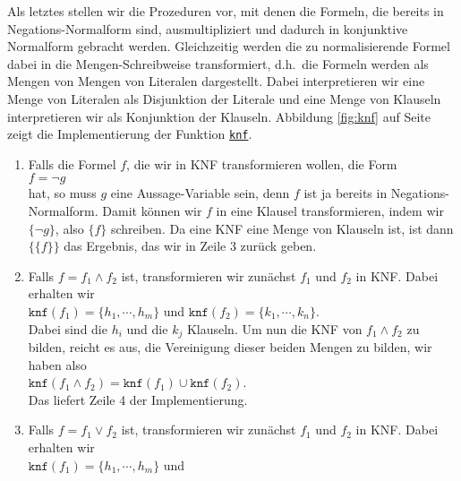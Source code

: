 Als letztes stellen wir die Prozeduren vor, mit denen die Formeln, die bereits in
Negations-Normalform sind, ausmultipliziert und dadurch in konjunktive
Normalform gebracht werden.  Gleichzeitig werden  die zu normalisierende Formel dabei
in die Mengen-Schreibweise transformiert, d.h.~die Formeln werden als Mengen von Mengen 
von Literalen dargestellt.  Dabei interpretieren wir eine Menge von Literalen als
Disjunktion der Literale und eine Menge von Klauseln interpretieren wir als Konjunktion
der Klauseln.
Abbildung \ref{fig:knf} auf Seite \pageref{fig:knf} zeigt die Implementierung der Funktion
\href{https://github.com/karlstroetmann/Logik/blob/master/SetlX/knf.stlx}{\texttt{knf}}.
\begin{enumerate}
\item Falls die Formel $f$, die wir in KNF transformieren wollen, die Form \\[0.2cm]
      \hspace*{1.3cm} $f = \neg g$ \\[0.2cm]
      hat, so muss $g$ eine Aussage-Variable sein, denn $f$ ist ja bereits in
      Negations-Normalform.  Damit k\"{o}nnen wir $f$ in eine Klausel transformieren, 
      indem wir $\{\neg g\}$, also $\{f\}$ schreiben.  
      Da eine KNF eine Menge von Klauseln ist, ist dann 
      $\bigl\{\{f\}\bigr\}$ das Ergebnis, das wir in Zeile 3 zur\"{u}ck geben.
\item Falls $f= f_1 \wedge f_2$ ist, transformieren wir zun\"{a}chst $f_1$ und $f_2$ in KNF.
      Dabei erhalten wir \\[0.2cm]
      \hspace*{1.3cm} 
      $\mathtt{knf}(f_1) = \{ h_1, \cdots, h_m \}$ \quad und \quad
      $\mathtt{knf}(f_2) = \{ k_1, \cdots, k_n \}$. \\[0.2cm]
      Dabei sind die $h_i$ und die $k_j$ Klauseln.  Um nun die KNF von $f_1 \wedge f_2$ 
      zu bilden, reicht es aus, die Vereinigung dieser beiden Mengen zu bilden,
      wir haben also \\[0.2cm]
      \hspace*{1.3cm} $\mathtt{knf}(f_1 \wedge f_2) = \mathtt{knf}(f_1) \cup  \mathtt{knf}(f_2)$.
      \\[0.2cm]
      Das liefert Zeile 4 der Implementierung.
\item Falls $f= f_1 \vee f_2$ ist, transformieren wir zun\"{a}chst $f_1$ und $f_2$ in KNF.
      Dabei erhalten wir \\[0.2cm]
      \hspace*{1.3cm} 
      $\mathtt{knf}(f_1) = \{ h_1, \cdots, h_m \}$ \quad und \quad

\end{enumerate}
